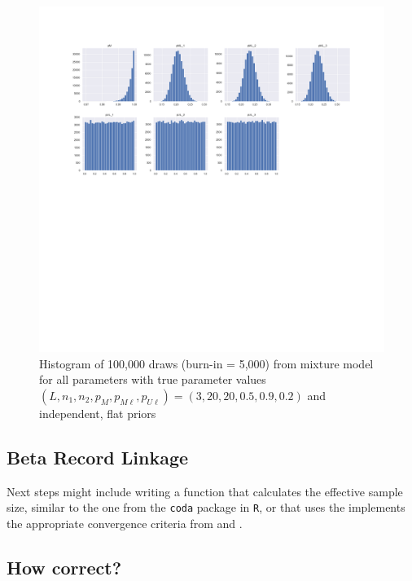 \documentclass[11pt,reqno]{amsart}
\begin{document}
\begin{figure}[h!]
\begin{center}
\includegraphics[width=\textwidth]{../Figures/mm/nM10/allParam_nM10_L3.png}
\vspace{-40pt}
\caption{Histogram of 100,000 draws (burn-in = 5,000) from mixture model for all parameters with true parameter values $(L, n_1, n_2, p_M, p_{M\ell}, p_{U\ell}) = (3, 20, 20, 0.5, 0.9, 0.2)$ and independent, flat priors}
\label{mmFlips}
\end{center}
\end{figure}


\subsection{Beta Record Linkage}

Next steps might include writing a function that calculates the effective sample size, similar to the one from the \texttt{coda} package in \texttt{R}, or that uses the implements the appropriate convergence criteria from \cite{brooks_gelman_1998} and  \cite{gelman_rubin_1992}.

\subsection{How correct?}
\end{document}
